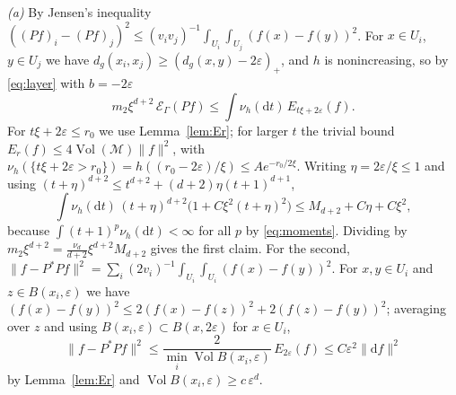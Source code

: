 \documentclass[11pt,a4paper]{article}
\makeatletter
\theoremstyle{stmt}
\theoremstyle{defn}
\theoremstyle{rmk}
\renewenvironment{proof}[1][\proofname]{\par\pushQED{\qed}\normalfont\topsep6\p@\@plus6\p@\relax
  \trivlist\item[\hskip\labelsep{\sffamily\itshape\small #1.}]\ignorespaces}{\popQED\endtrivlist\@endpefalse}
\numberwithin{equation}{section}
\DeclareMathOperator{\Vol}{Vol}
\newcommand{\M}{\mathcal{M}}
\newcommand{\dd}{\mathrm{d}}
\makeatother
\begin{document}
\begin{proof}
\emph{(a)} By Jensen's inequality $((Pf)_i-(Pf)_j)^2\le(v_iv_j)^{-1}\int_{U_i}\int_{U_j}(f(x)-f(y))^2$. For $x\in U_i$, $y\in U_j$ we have $d_g(x_i,x_j)\ge(d_g(x,y)-2\varepsilon)_+$, and $h$ is nonincreasing, so by \eqref{eq:layer} with $b=-2\varepsilon$
\[
m_2\xi^{d+2}\,\mathcal E_\Gamma(Pf)\le\int\nu_h(\dd t)\,E_{t\xi+2\varepsilon}(f).
\]
For $t\xi+2\varepsilon\le r_0$ we use Lemma~\ref{lem:Er}; for larger $t$ the trivial bound $E_r(f)\le4\Vol(\M)\|f\|^2$, with $\nu_h(\{t\xi+2\varepsilon>r_0\})=h((r_0-2\varepsilon)/\xi)\le Ae^{-r_0/2\xi}$. Writing $\eta=2\varepsilon/\xi\le1$ and using $(t+\eta)^{d+2}\le t^{d+2}+(d+2)\eta(t+1)^{d+1}$,
\[
\int\nu_h(\dd t)\,(t+\eta)^{d+2}\big(1+C\xi^2(t+\eta)^2\big)\le M_{d+2}+C\eta+C\xi^2 ,
\]
because $\int(t+1)^p\nu_h(\dd t)<\infty$ for all $p$ by \eqref{eq:moments}. Dividing by $m_2\xi^{d+2}=\tfrac{\nu_d}{d+2}\xi^{d+2}M_{d+2}$ gives the first claim. For the second, $\|f-P^*Pf\|^2=\sum_i(2v_i)^{-1}\int_{U_i}\int_{U_i}(f(x)-f(y))^2$. For $x,y\in U_i$ and $z\in B(x_i,\varepsilon)$ we have $(f(x)-f(y))^2\le2(f(x)-f(z))^2+2(f(z)-f(y))^2$; averaging over $z$ and using $B(x_i,\varepsilon)\subset B(x,2\varepsilon)$ for $x\in U_i$,
\[
\|f-P^*Pf\|^2\le\frac{2}{\min_i\Vol B(x_i,\varepsilon)}\,E_{2\varepsilon}(f)\le C\varepsilon^2\|\dd f\|^2
\]
by Lemma~\ref{lem:Er} and $\Vol B(x_i,\varepsilon)\ge c\,\varepsilon^d$.


\end{proof}
\end{document}
